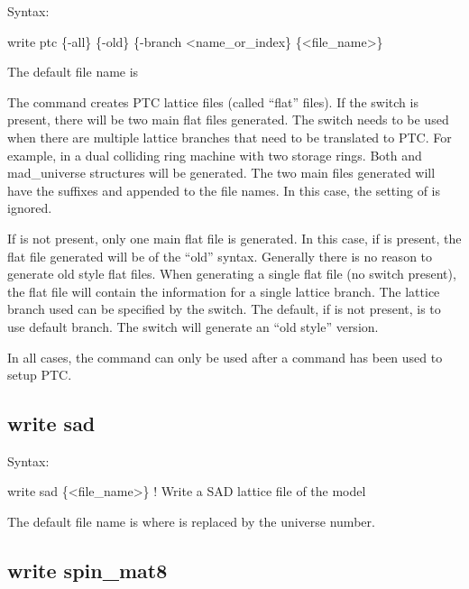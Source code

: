 {{{{{{{{{{{Syntax:
\begin{example}
  write ptc \{-all\} \{-old\} \{-branch <name_or_index\} \{<file_name>\}
\end{example}

The default file name is 

The  command creates PTC lattice files (called ``flat'' files).  If the 
switch is present, there will be two main flat files generated. The  switch needs to be
used when there are multiple lattice branches that need to be translated to PTC. For example, in a
dual colliding ring machine with two storage rings. Both  and  mad_universe
structures will be generated. The two main files generated will have the suffixes  and
 appended to the file names. In this case, the setting of  is ignored.

If  is not present, only one main flat file is generated. In this case, if  is
present, the flat file generated will be of the ``old'' syntax. Generally there is no reason to
generate old style flat files. When generating a single flat file (no  switch present), the
flat file will contain the information for a single lattice branch. The lattice branch used can be
specified by the  switch. The default, if  is not present, is to use default
branch. The  switch will generate an ``old style'' version.

In all cases, the  command can only be used after a  command has been
used to setup PTC.


\subsection{write sad}
\label{s:write.sad}

Syntax:
\begin{example}
  write sad \{<file_name>\}  ! Write a SAD lattice file of the model
\end{example}

The default file name is  where \vn{\#} is replaced by the universe number. 


\subsection{write spin_mat8}
\label{s:write.spin.mat8}

}}}}}}}}}}}
